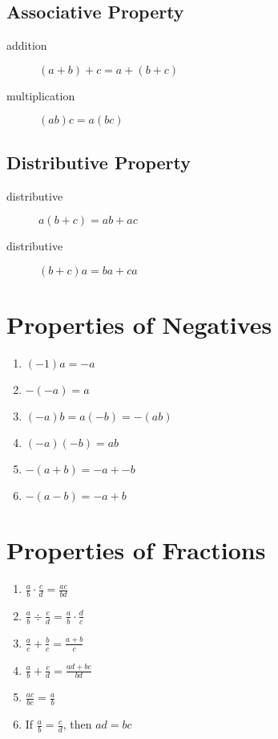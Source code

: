 \subsection{Associative Property}
\begin{description}
    \item[addition] $(a + b) + c = a + (b + c)$
    \item[multiplication] $(ab)c = a(bc)$
\end{description}

\subsection{Distributive Property}
\begin{description}
    \item[distributive] $a(b + c) = ab + ac$
    \item[distributive] $(b + c)a = ba + ca$
\end{description}

\section{Properties of Negatives}
\begin{enumerate}
    \item $(-1)a = -a$
    \item $-(-a) = a$
    \item $(-a)b = a(-b) = -(ab)$
    \item $(-a)(-b) = ab$
    \item $-(a + b) = -a + -b$
    \item $-(a - b) = -a + b$
\end{enumerate}

\section{Properties of Fractions}
\begin{enumerate}
    \item $\frac{a}{b} \cdot \frac{c}{d} = \frac{ac}{bd}$
    \item $\frac{a}{b} \div \frac{c}{d} = \frac{a}{b} \cdot \frac{d}{c}$
    \item $\frac{a}{c} + \frac{b}{c} = \frac{a + b}{c}$
    \item $\frac{a}{b} + \frac{c}{d} = \frac{ad + bc}{bd}$
    \item $\frac{ac}{bc} = \frac{a}{b}$
    \item If $\frac{a}{b} = \frac{c}{d}$, then $ad = bc$
\end{enumerate}

